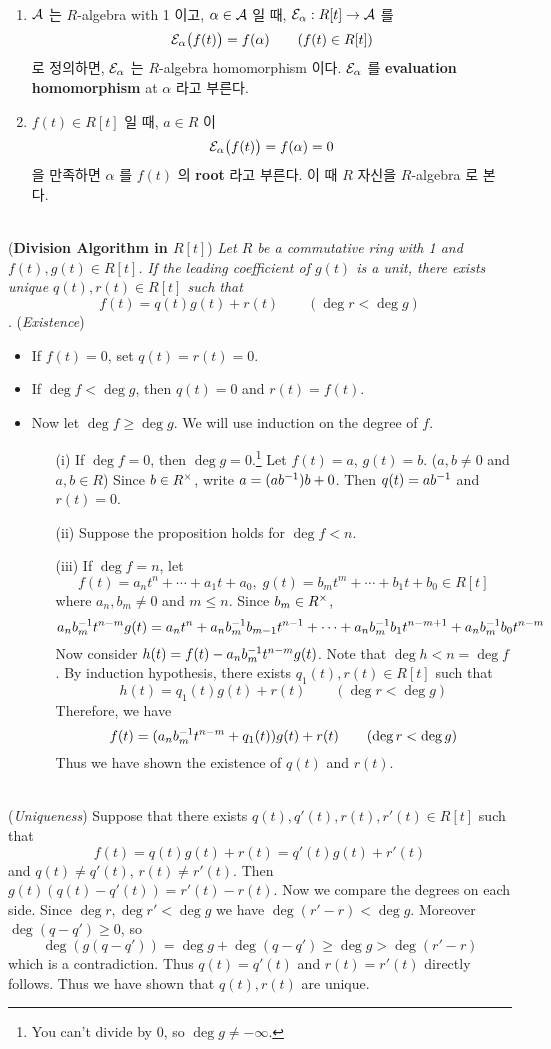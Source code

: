 \\
\begin{enumerate}
	\item $\mathcal{A}$ 는 $R$-algebra with 1 이고, $\alpha\in \mathcal{A}$ 일 때, $\mathcal{E}_\alpha:R[t]\rightarrow \mathcal{A}$ 를
	$$\mathcal{E}_\alpha\big(f(t)\big) = f(\alpha) \qquad (f(t)\in R[t])$$
	로 정의하면, $\mathcal{E}_\alpha$ 는 $R$-algebra homomorphism 이다. $\mathcal{E}_\alpha$ 를 \textbf{evaluation homomorphism} at $\alpha$ 라고 부른다.
	\item $f(t)\in R[t]$ 일 때, $a\in R$ 이 $$\mathcal{E}_\alpha\big(f(t)\big) = f(\alpha) = 0$$
	을 만족하면 $\alpha$ 를 $f(t)$ 의 \textbf{root} 라고 부른다. 이 때 $R$ 자신을 $R$-algebra 로 본다.
\end{enumerate}~
\pagebreak\\
 (\textbf{Division Algorithm in $R[t]$}) \textit{Let $R$ be a commutative ring with 1 and $f(t), g(t)\in R[t]$. If the leading coefficient of $g(t)$ is a unit, there exists unique $q(t), r(t)\in R[t]$ such that
	$$f(t) = q(t)g(t)+r(t) \qquad (\deg r < \deg g)$$
}
\pf. (\textit{Existence})
\begin{itemize}
	\item If $f(t) = 0$, set $q(t) =r(t) = 0$.
	\item If $\deg f < \deg g$, then $q(t) = 0$ and $r(t) = f(t)$.
	\item Now let $\deg f \geq \deg g$. We will use induction on the degree of $f$.
	\begin{enumerate}
		\item[(i)] If $\deg f = 0$, then $\deg g = 0$.\footnote{You can't divide by 0, so $\deg g \neq -\infty$.} Let $f(t) = a$, $g(t) = b$. ($a, b\neq 0$ and $a, b\in R$) Since $b\in R^\times$, write $a = (ab^{-1})b + 0$. Then $q(t) = ab^{-1}$ and $r(t) = 0$.
		\item[(ii)] Suppose the proposition holds for $\deg f < n$.
		\item[(iii)] If $\deg f = n$, let
		$$f(t) = a_nt^n + \cdots + a_1t + a_0,\; g(t) = b_mt^m + \cdots + b_1t + b_0 \in R[t]$$
		where $a_n, b_m\neq 0$ and $m\leq n$. Since $b_m\in R^\times$,
		$$a_nb_m^{-1} t^{n-m}g(t) = a_nt^n + a_nb_m^{-1} b_{m-1}t^{n-1} + \cdots + a_nb_m^{-1} b_1 t^{n-m+1}+a_nb_m^{-1} b_0 t^{n-m}$$
		Now consider $h(t) = f(t) - a_nb_m^{-1} t^{n-m} g(t)$. Note that $\deg h < n = \deg f$. By induction hypothesis, there exists $q_1(t), r(t)\in R[t]$ such that
		$$h(t) = q_1(t)g(t) + r(t) \qquad (\deg r < \deg g)$$
		Therefore, we have
		$$f(t) = (a_nb_m^{-1} t^{n-m} + q_1(t))g(t) + r(t) \qquad (\deg r < \deg g)$$
		Thus we have shown the existence of $q(t)$ and $r(t)$.
	\end{enumerate}
\end{itemize}~\\
(\textit{Uniqueness}) Suppose that there exists $q(t), q'(t), r(t), r'(t)\in R[t]$ such that 
$$f(t) = q(t)g(t)+r(t) = q'(t)g(t)+r'(t)$$
and $q(t)\neq q'(t)$, $r(t)\neq r'(t)$.
Then $g(t)(q(t) - q'(t)) = r'(t)-r(t)$. Now we compare the degrees on each side. Since $\deg r, \deg r' < \deg g$ we have $\deg (r'-r)<\deg g$. Moreover $\deg (q-q') \geq 0$, so
$$\deg(g(q-q')) = \deg g + \deg(q - q') \geq \deg g > \deg (r' - r)$$
which is a contradiction. Thus $q(t) = q'(t)$ and $r(t)=r'(t)$ directly follows. Thus we have shown that $q(t), r(t)$ are unique.
